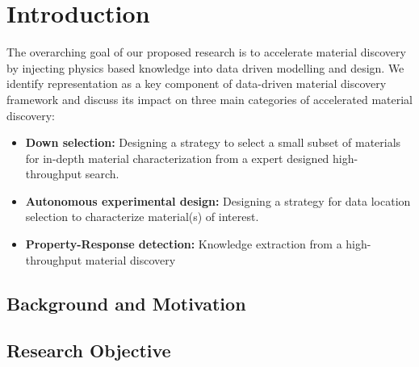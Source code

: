 \chapter{Introduction}\label{chap:intro}
The overarching goal of our proposed research is to accelerate material discovery by injecting physics based knowledge into data driven modelling and design.
We identify representation as a key component of data-driven material discovery framework and discuss its impact on three main categories of accelerated material discovery:
\begin{itemize}
    \item {\textbf{Down selection: }Designing a strategy to select a small subset of materials for in-depth material characterization from a expert designed high-throughput search.}
    \item {\textbf{Autonomous experimental design: }Designing a strategy for data location selection to characterize material(s) of interest.}
    \item {\textbf{Property-Response detection: }Knowledge extraction from a high-throughput material discovery }
\end{itemize}
\section{Background and Motivation}\label{sec1.1}
 
\section{Research Objective}\label{sec1.2}

